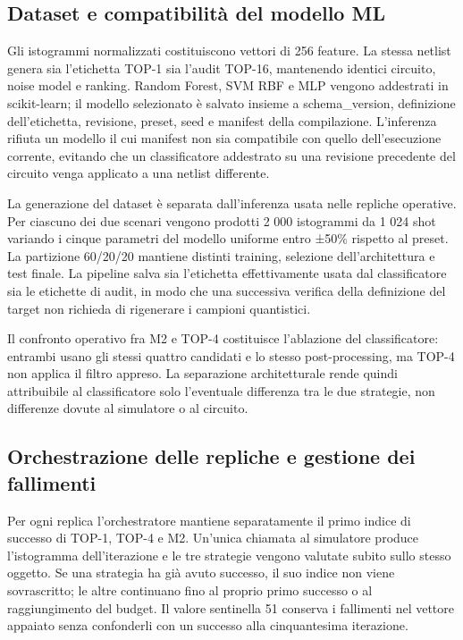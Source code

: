 \subsection{Dataset e compatibilità del modello ML}\label{sec:finale_4_5_2}

Gli istogrammi normalizzati costituiscono vettori di 256 feature. La stessa netlist genera sia l'etichetta TOP-1 sia l'audit TOP-16, mantenendo identici circuito, noise model e ranking. Random Forest, SVM RBF e MLP vengono addestrati in scikit-learn; il modello selezionato è salvato insieme a schema\_version, definizione dell'etichetta, revisione, preset, seed e manifest della compilazione. L'inferenza rifiuta un modello il cui manifest non sia compatibile con quello dell'esecuzione corrente, evitando che un classificatore addestrato su una revisione precedente del circuito venga applicato a una netlist differente.

La generazione del dataset è separata dall'inferenza usata nelle repliche operative. Per ciascuno dei due scenari vengono prodotti 2 000 istogrammi da 1 024 shot variando i cinque parametri del modello uniforme entro ±50\% rispetto al preset. La partizione 60/20/20 mantiene distinti training, selezione dell'architettura e test finale. La pipeline salva sia l'etichetta effettivamente usata dal classificatore sia le etichette di audit, in modo che una successiva verifica della definizione del target non richieda di rigenerare i campioni quantistici.

Il confronto operativo fra M2 e TOP-4 costituisce l'ablazione del classificatore: entrambi usano gli stessi quattro candidati e lo stesso post-processing, ma TOP-4 non applica il filtro appreso. La separazione architetturale rende quindi attribuibile al classificatore solo l'eventuale differenza tra le due strategie, non differenze dovute al simulatore o al circuito.

\subsection{Orchestrazione delle repliche e gestione dei fallimenti}\label{sec:finale_4_5_3}

Per ogni replica l'orchestratore mantiene separatamente il primo indice di successo di TOP-1, TOP-4 e M2. Un'unica chiamata al simulatore produce l'istogramma dell'iterazione e le tre strategie vengono valutate subito sullo stesso oggetto. Se una strategia ha già avuto successo, il suo indice non viene sovrascritto; le altre continuano fino al proprio primo successo o al raggiungimento del budget. Il valore sentinella 51 conserva i fallimenti nel vettore appaiato senza confonderli con un successo alla cinquantesima iterazione.

